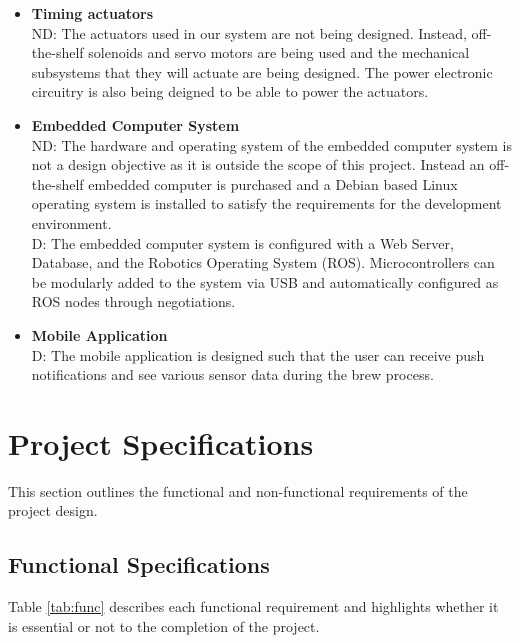 \documentclass{article}
\begin{document}
\begin{itemize}
\item\textbf{Timing actuators}
\\ND: The actuators used in our system are not being designed. Instead, off-the-shelf solenoids and servo motors are being used and the mechanical subsystems that they will actuate are being designed. The power electronic circuitry is also being deigned to be able to power the actuators.

\item\textbf{Embedded Computer System}
\\ND: The hardware and operating system of the embedded computer system is not a design objective as it is outside the scope of this project. Instead an off-the-shelf embedded computer is purchased and a Debian based Linux operating system is installed to satisfy the requirements for the development environment.
\\D: The embedded computer system is configured with a Web Server, Database, and the Robotics Operating System (ROS).  Microcontrollers can be modularly added to the system via USB and automatically configured as ROS nodes through negotiations.

\item\textbf{Mobile Application}
\\D: The mobile application is designed such that the user can receive push notifications and see various sensor data during the brew process.
\end{itemize}

\section{Project Specifications}
This section outlines the functional and non-functional requirements of the project design.
\subsection{Functional Specifications}
Table \ref{tab:func} describes each functional requirement and highlights whether it is essential or not to the completion of the project.
\end{document}
